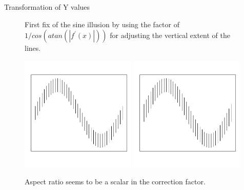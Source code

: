 \documentclass[11pt]{article}\usepackage{graphicx, color}
\newenvironment{knitrout}{}{} %
\begin{document}
\begin{subsection}{Transformation of Y values}
\begin{figure}[hbtp]
{}




\caption{\label{firstfix} First fix of the sine illusion by using the factor of $1/cos(atan(|f^\prime(x)|))$ for adjusting the vertical extent of the lines.}
\end{figure}

\begin{figure}
\centering
\begin{knitrout}
\color{fgcolor}

{\centering \includegraphics[width=0.49\textwidth]{figure/fig-secondfix1} 
\includegraphics[width=0.49\textwidth]{figure/fig-secondfix2} 

}



\end{knitrout}

\caption{\label{secondfix} Aspect ratio seems to be a scalar in the correction factor.}
\end{figure}

\begin{figure}
\centering
\begin{knitrout}
\color{fgcolor}


\end{knitrout}
\end{figure}
\end{subsection}
\end{document}
